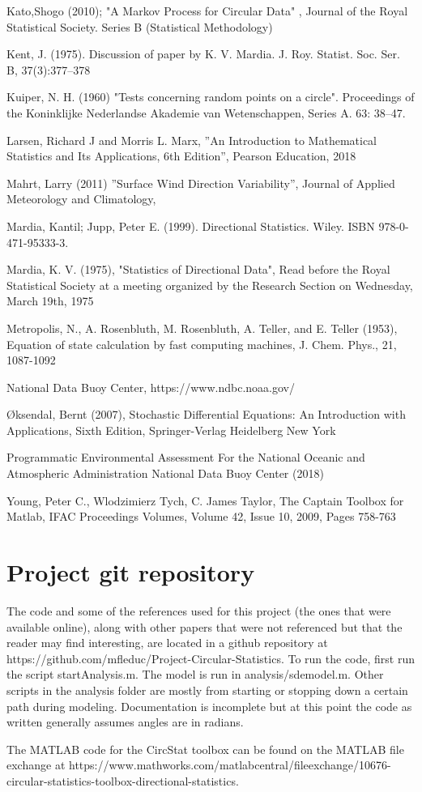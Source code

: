 \documentclass[12pt]{article}
\numberwithin{equation}{section}
\numberwithin{figure}{section}
\begin{document}
\begin{thebibliography}{1}
 Kato,Shogo (2010); "A Markov Process for Circular Data" , Journal of the Royal Statistical Society. Series B (Statistical Methodology)

 Kent, J. (1975). Discussion of paper by K. V. Mardia. J. Roy. Statist. Soc. Ser. B, 37(3):377–378

 Kuiper, N. H. (1960) "Tests concerning random points on a circle". Proceedings of the Koninklijke Nederlandse Akademie van Wetenschappen, Series A. 63: 38–47.

Larsen, Richard J and Morris L. Marx, ''An Introduction to Mathematical Statistics and Its Applications, 6th Edition'', Pearson Education, 2018

 Mahrt, Larry (2011) ''Surface Wind Direction Variability'',  Journal of Applied Meteorology and Climatology, 

Mardia, Kantil; Jupp, Peter E. (1999). Directional Statistics. Wiley. ISBN 978-0-471-95333-3.

 Mardia, K. V. (1975), "Statistics of Directional Data", Read before the Royal Statistical Society at a meeting organized by the Research Section on Wednesday, March 19th, 1975

Metropolis, N., A.  Rosenbluth, M.  Rosenbluth, A.  Teller, and E. Teller (1953), Equation of state calculation by fast computing machines, J. Chem. Phys., 21, 1087-1092

 National Data Buoy Center, https://www.ndbc.noaa.gov/

 Øksendal, Bernt (2007), Stochastic Differential Equations: An Introduction with Applications, Sixth Edition, Springer-Verlag Heidelberg New York

 Programmatic Environmental Assessment For the National Oceanic and Atmospheric Administration National Data Buoy Center (2018)  

 Young, Peter C., Wlodzimierz Tych, C. James Taylor, The Captain Toolbox for Matlab,
IFAC Proceedings Volumes,
Volume 42, Issue 10,
2009,
Pages 758-763
 \end{thebibliography}

\appendix
\section{Project git repository}
The code and some of the references used for this project (the ones that were available online), along with other papers that were not referenced but that the reader may find interesting, are located in a github repository at https://github.com/mfleduc/Project-Circular-Statistics. To run the code, first run the script startAnalysis.m. The model is run in analysis/sdemodel.m. Other scripts in the analysis folder are mostly from starting or stopping down a certain path during modeling. Documentation is incomplete but at this point the code as written generally assumes angles are in radians. 

 The MATLAB code for the CircStat toolbox can be found on the MATLAB file exchange at https://www.mathworks.com/matlabcentral/fileexchange/10676-circular-statistics-toolbox-directional-statistics.
\end{document}
